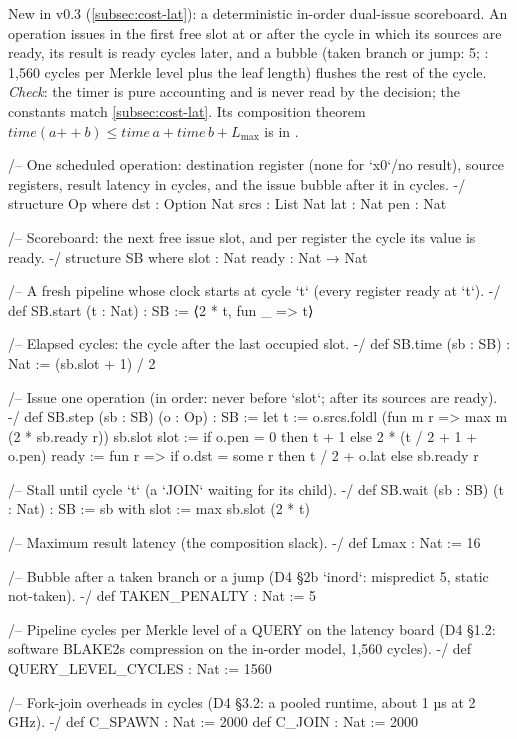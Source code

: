 New in v0.3 (\cref{subsec:cost-lat}): a deterministic in-order dual-issue scoreboard. An operation
issues in the first free slot at or after the cycle in which its sources are ready, its result is
ready  cycles later, and a bubble  (taken branch or jump: 5; : 1,560
cycles per Merkle level plus the leaf length) flushes the rest of the cycle. \emph{Check}: the
timer is pure accounting and is never read by the decision; the constants match
\cref{subsec:cost-lat}. Its composition theorem $\mathit{time}(a\mathbin{+\!\!+}b)\le
\mathit{time}\,a+\mathit{time}\,b+L_{\max}$ is in .

\begin{leancode}[fontsize=\scriptsize,label={\footnotesize Contract/Timer.lean}]
/-- One scheduled operation: destination register (none for `x0`/no result), source registers,
result latency in cycles, and the issue bubble after it in cycles. -/
structure Op where
  dst : Option Nat
  srcs : List Nat
  lat : Nat
  pen : Nat

/-- Scoreboard: the next free issue slot, and per register the cycle its value is ready. -/
structure SB where
  slot : Nat
  ready : Nat → Nat

/-- A fresh pipeline whose clock starts at cycle `t` (every register ready at `t`). -/
def SB.start (t : Nat) : SB := ⟨2 * t, fun _ => t⟩

/-- Elapsed cycles: the cycle after the last occupied slot. -/
def SB.time (sb : SB) : Nat := (sb.slot + 1) / 2

/-- Issue one operation (in order: never before `slot`; after its sources are ready). -/
def SB.step (sb : SB) (o : Op) : SB :=
  let t := o.srcs.foldl (fun m r => max m (2 * sb.ready r)) sb.slot
  { slot := if o.pen = 0 then t + 1 else 2 * (t / 2 + 1 + o.pen)
    ready := fun r => if o.dst = some r then t / 2 + o.lat else sb.ready r }

/-- Stall until cycle `t` (a `JOIN` waiting for its child). -/
def SB.wait (sb : SB) (t : Nat) : SB := { sb with slot := max sb.slot (2 * t) }

/-- Maximum result latency (the composition slack). -/
def Lmax : Nat := 16

/-- Bubble after a taken branch or a jump (D4 §2b `inord`: mispredict 5, static not-taken). -/
def TAKEN_PENALTY : Nat := 5

/-- Pipeline cycles per Merkle level of a QUERY on the latency board (D4 §1.2: software
BLAKE2s compression on the in-order model, 1,560 cycles). -/
def QUERY_LEVEL_CYCLES : Nat := 1560

/-- Fork-join overheads in cycles (D4 §3.2: a pooled runtime, about 1 µs at 2 GHz). -/
def C_SPAWN : Nat := 2000
def C_JOIN : Nat := 2000
\end{leancode}

